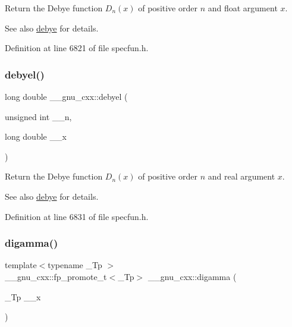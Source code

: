 Return the Debye function $ D_n(x) $ of positive order $ n $ and {\ttfamily float} argument $ x $.

\begin{DoxySeeAlso}{See also}
\hyperlink{group__gnu__math__spec__func_ga0b14de47c011de3ebf771c9f29b2b78c}{debye} for details. 
\end{DoxySeeAlso}


Definition at line 6821 of file specfun.\+h.

\mbox{\label{group__gnu__math__spec__func_ga2db11e767b89bbd36be6ebfadda3401f}} 
\subsubsection{\texorpdfstring{debyel()}{debyel()}}
{\footnotesize\ttfamily long double \+\_\+\+\_\+gnu\+\_\+cxx\+::debyel (\begin{DoxyParamCaption}\item[{unsigned int}]{\+\_\+\+\_\+n,  }\item[{long double}]{\+\_\+\+\_\+x }\end{DoxyParamCaption})\hspace{0.3cm}{\ttfamily [inline]}}

Return the Debye function $ D_n(x) $ of positive order $ n $ and real argument $ x $.

\begin{DoxySeeAlso}{See also}
\hyperlink{group__gnu__math__spec__func_ga0b14de47c011de3ebf771c9f29b2b78c}{debye} for details. 
\end{DoxySeeAlso}


Definition at line 6831 of file specfun.\+h.

\mbox{\label{group__gnu__math__spec__func_ga7b87300edf8754d959e1d94fe0c9246e}} 
\subsubsection{\texorpdfstring{digamma()}{digamma()}}
{\footnotesize\ttfamily template$<$typename \+\_\+\+Tp $>$ \\
\+\_\+\+\_\+gnu\+\_\+cxx\+::fp\+\_\+promote\+\_\+t$<$\+\_\+\+Tp$>$ \+\_\+\+\_\+gnu\+\_\+cxx\+::digamma (\begin{DoxyParamCaption}\item[{\+\_\+\+Tp}]{\+\_\+\+\_\+x }\end{DoxyParamCaption})\hspace{0.3cm}{\ttfamily [inline]}}

